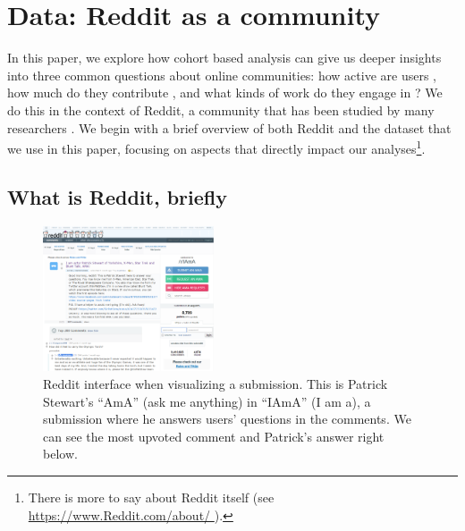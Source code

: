 \section{Data: Reddit as a community}

In this paper, we explore how cohort based analysis can give us deeper insights into three common questions about online communities: how active are users \cite{Scellato2011,Hughes2009,Java2007,Levy1984}, how much do they contribute \cite{Scellato2011,Gruhl2004,Guo2009}, and what kinds of work do they engage in \cite{Welser2011,Choi2010,Panciera2009}?  We do this in the context of Reddit, a community that has been studied by many researchers \cite{Gilbert2013,Stoddard2015,Bergstrom2011,Tan2015}. We begin with a brief overview of both Reddit and the dataset that we use in this paper, focusing on aspects that directly impact our analyses\footnote{There is more to say about Reddit itself (see \url{https://www.Reddit.com/about/ }).}.


\subsection{What is Reddit, briefly}

\begin{figure}[!tb]
\centering
\includegraphics[width=0.45\textwidth,natwidth=964,natheight=823]{./images/reddit.png}
\caption{Reddit interface when visualizing a submission. This is Patrick Stewart's ``AmA'' (ask me anything) in ``IAmA'' (I am a), a submission where he answers users' questions in the comments. We can see the most upvoted comment and Patrick's answer right below.}
\label{fig:reddit}
\end{figure}

